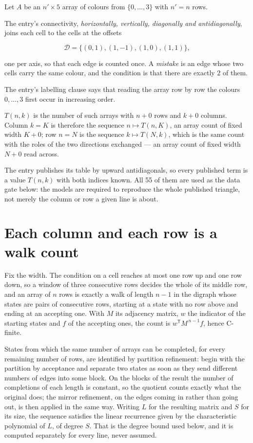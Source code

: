 \documentclass[11pt]{article}
\theoremstyle{definition}
\begin{document}
Let $A$ be an $n' \times 5$ array of colours from $\{0,\dots,3\}$ with $n' = n$ rows.

The entry's connectivity, {\itshape horizontally, vertically, diagonally and antidiagonally}, joins each cell to the cells at the offsets

\[\mathcal{D} = \{(0,1), (1,-1), (1,0), (1,1)\},\]

one per axis, so that each edge is counted once. A {\itshape mistake} is an edge whose two cells carry the same colour, and the condition is that there are exactly $2$ of them.

The entry's labelling clause says that reading the array row by row the colours $0,\dots,3$ first occur in increasing order.

$T(n,k)$ is the number of such arrays with $n + 0$ rows and $k + 0$ columns. Column $k = K$ is therefore the sequence $n \mapsto T(n,K)$, an array count of fixed width $K + 0$; row $n = N$ is the sequence $k \mapsto T(N,k)$, which is the same count with the roles of the two directions exchanged --- an array count of fixed width $N + 0$ read across.

The entry publishes its table by upward antidiagonals, so every published term is a value $T(n,k)$ with both indices known. All 55 of them are used as the data gate below: the models are required to reproduce the whole published triangle, not merely the column or row a given line is about.

\section{Each column and each row is a walk count}

Fix the width. The condition on a cell reaches at most one row up and one row down, so a window of three consecutive rows decides the whole of its middle row, and an array of $n$ rows is exactly a walk of length $n-1$ in the digraph whose states are pairs of consecutive rows, starting at a state with no row above and ending at an accepting one. With $M$ its adjacency matrix, $w$ the indicator of the starting states and $f$ of the accepting ones, the count is $w^{\mathsf T}M^{\,n-1}f$, hence C-finite.

States from which the same number of arrays can be completed, for every remaining number of rows, are identified by partition refinement: begin with the partition by acceptance and separate two states as soon as they send different numbers of edges into some block. On the blocks of the result the number of completions of each length is constant, so the quotient counts exactly what the original does; the mirror refinement, on the edges coming in rather than going out, is then applied in the same way. Writing $L$ for the resulting matrix and $S$ for its size, the sequence satisfies the linear recurrence given by the characteristic polynomial of $L$, of degree $S$. That is the degree bound used below, and it is computed separately for every line, never assumed.
\end{document}
